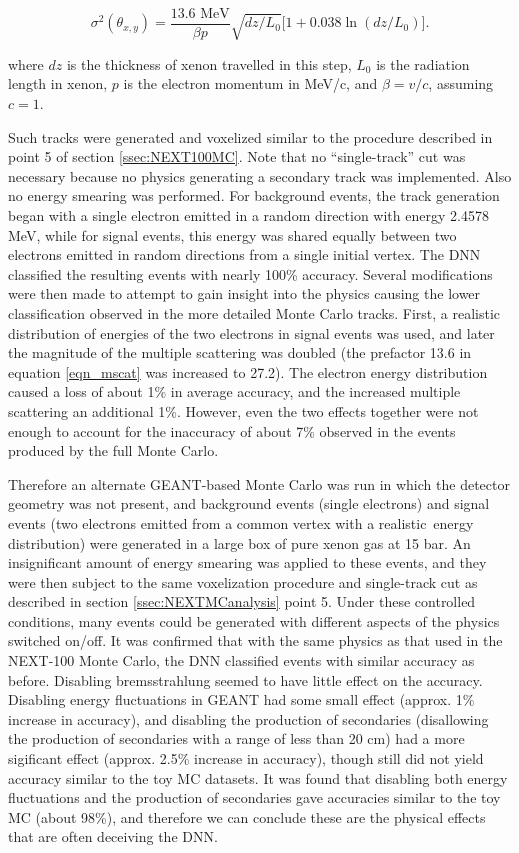 \documentclass[a4paper,11pt]{article}
\begin{document}
\begin{equation}\label{eqn_mscat}
\sigma^{2}(\theta_{x,y}) = \frac{13.6\,\,\mathrm{MeV}}{\beta p}\sqrt{dz/L_{0}}\bigl[1 + 0.038\ln(dz/L_{0})\bigr].
\end{equation}

\noindent where $dz$ is the thickness of xenon travelled in this step, $L_{0}$ is the radiation length in xenon, $p$ is the electron momentum in MeV/c, and $\beta = v/c$, assuming $c = 1$.

Such tracks were generated and voxelized similar to the procedure described in point 5 of section \ref{ssec:NEXT100MC}.  Note that no ``single-track'' cut was necessary because no
physics generating a secondary track was implemented.  Also no energy smearing was performed.  For background events, the track generation began with a single electron emitted in a
random direction with energy 2.4578 MeV, while for signal events, this energy was shared equally between two electrons emitted in random directions from a single initial vertex.  The DNN
classified the resulting events with nearly 100\% accuracy.  Several modifications were then made to attempt to gain insight into the physics causing the lower classification observed in the
more detailed Monte Carlo tracks.  First, a realistic distribution of energies of the two electrons in signal events \cite{Ponkratenko_2000} was used, and later the magnitude of the multiple scattering was doubled (the prefactor 13.6 in equation \ref{eqn_mscat} was increased to 27.2).  The electron energy distribution caused a loss of about 1\% in average accuracy, and the
increased multiple scattering an additional 1\%.  However, even the two effects together were not enough to account for the inaccuracy of about 7\% observed in the events produced by the
full Monte Carlo.

Therefore an alternate GEANT-based Monte Carlo was run in which the detector geometry was not present, and background events (single electrons) and signal events (two electrons emitted
from a common vertex with a realistic \bbonu\,energy distribution) were generated in a large box of pure xenon gas at 15 bar.  An insignificant amount of energy smearing was applied to these
events, and they were then subject to the same voxelization procedure and single-track cut as described in section \ref{ssec:NEXTMCanalysis} point 5.  Under these controlled conditions, many 
events could be generated with different aspects of the physics switched on/off.  It was confirmed that with the same physics as that used in the NEXT-100 Monte Carlo, the DNN classified events 
with similar accuracy as before.  Disabling bremsstrahlung seemed to have little effect on the accuracy.  Disabling energy fluctuations in GEANT had some small effect (approx. 1\% increase in
accuracy), and disabling the production of secondaries (disallowing the production of secondaries with a range of less than 20 cm) had a more sigificant effect (approx. 2.5\% increase in accuracy),
though still did not yield accuracy similar to the toy MC datasets.  It was found that disabling both energy fluctuations and the production of secondaries gave accuracies similar to the toy MC
(about 98\%), and therefore we can conclude these are the physical effects that are often deceiving the DNN.
\end{document}
